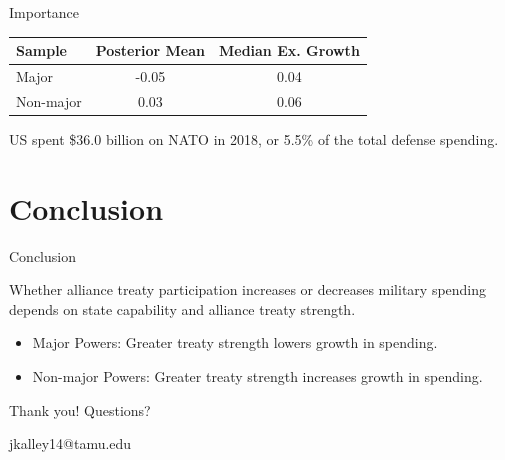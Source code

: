\documentclass{beamer}
\begin{document}

\begin{frame}[standout]{Importance} 

\begin{tabular}{lcc}
Sample & Posterior Mean & Median Ex. Growth \\
\hline
Major & -0.05 & 0.04 \\
\pause
Non-major & 0.03 & 0.06  \\
\end{tabular}

\pause

US spent \$36.0 billion on NATO in 2018, or 5.5\% of the total defense spending. 


\end{frame}


\section{Conclusion}


\begin{frame}{Conclusion}

Whether alliance treaty participation increases or decreases military spending depends on state capability and alliance treaty strength.  

\pause

\begin{itemize}
\item Major Powers: Greater treaty strength lowers growth in spending. 
\pause
\item Non-major Powers: Greater treaty strength increases growth in spending.  
\end{itemize}

\end{frame}


 \begin{frame}[standout]

Thank you! Questions? 

jkalley14@tamu.edu

 \end{frame}


\end{document}
